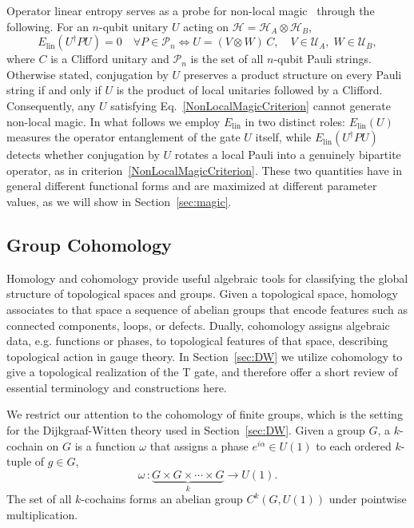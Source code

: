 \documentclass[12pt,a4paper]{article}
\begin{document}
Operator linear entropy serves as a probe for non-local magic~\cite{faidon:2026} through the following. For an $n$-qubit unitary $U$ acting on $\mathcal{H} = \mathcal{H}_A \otimes \mathcal{H}_B$,
%
\begin{equation}\label{NonLocalMagicCriterion}
E_{\mathrm{lin}}\left(U^\dagger P U \right) = 0 \quad \forall P \in \mathcal{P}_n \iff U = (V \otimes W)\,C, \quad V \in \mathcal{U}_A,\; W \in \mathcal{U}_B,
\end{equation}
%
where $C$ is a Clifford unitary and $\mathcal{P}_n$ is the set of all $n$-qubit Pauli strings. Otherwise stated, conjugation by $U$ preserves a product structure on every Pauli string if and only if $U$ is the product of local unitaries followed by a Clifford. Consequently, any $U$ satisfying Eq.\ \eqref{NonLocalMagicCriterion} cannot generate non-local magic. In what follows we employ $E_{\mathrm{lin}}$ in two distinct roles: $E_{\mathrm{lin}}(U)$ measures the operator entanglement of the gate $U$ itself, while $E_{\mathrm{lin}}(U^\dagger P U)$ detects whether conjugation by $U$ rotates a local Pauli into a genuinely bipartite operator, as in criterion\ \eqref{NonLocalMagicCriterion}. These two quantities have in general different functional forms and are maximized at different parameter values, as we will show in Section~\ref{sec:magic}.

\subsection{Group Cohomology}\label{subsec:cohomology}

Homology and cohomology provide useful algebraic tools for classifying the global structure of topological spaces and groups. Given a topological space, homology associates to that space a sequence of abelian groups that encode features such as connected components, loops, or defects. Dually, cohomology assigns algebraic data, e.g. functions or phases, to topological features of that space, describing topological action in gauge theory. In Section~\ref{sec:DW} we utilize cohomology to give a topological realization of the T gate, and therefore offer a short review of essential terminology and constructions here.

We restrict our attention to the cohomology of finite groups, which is the setting for the Dijkgraaf-Witten theory used in Section~\ref{sec:DW}. Given a group $G$, a $k$-cochain on $G$ is a function $\omega$ that assigns a phase $e^{i\alpha} \in U(1)$ to each ordered $k$-tuple of $g \in G$,
%
\begin{equation}\label{kCochain}
\omega\,\colon \underbrace{G \times G \times \cdots \times G}_{k} \to U(1).
\end{equation}
%
The set of all $k$-cochains forms an abelian group $C^k(G, U(1))$ under pointwise multiplication.
\end{document}
